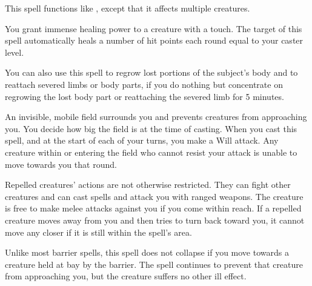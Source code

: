 \begin{spelleffect}
    This spell functions like , except that it affects multiple creatures.
\end{spelleffect}

\spelldur{\durshort}
\begin{spelleffect}
    You grant immense healing power to a creature with a touch. The target of this spell automatically heals a number of hit points each round equal to your caster level.
    \par You can also use this spell to regrow lost portions of the subject's body and to reattach severed limbs or body parts, if you do nothing but concentrate on regrowing the lost body part or reattaching the severed limb for 5 minutes.
\end{spelleffect}

\spelldur{\durshort \dismissable}
\begin{spelleffect}
    An invisible, mobile field surrounds you and prevents creatures from approaching you. You decide how big the field is at the time of casting. When you cast this spell, and at the start of each of your turns, you make a Will attack. Any creature within or entering the field who cannot resist your attack is unable to move towards you that round.

    Repelled creatures' actions are not otherwise restricted. They can fight other creatures and can cast spells and attack you with ranged weapons. The creature is free to make melee attacks against you if you come within reach. If a repelled creature moves away from you and then tries to turn back toward you, it cannot move any closer if it is still within the spell's area.
\end{spelleffect}
\begin{spellnotes}
    Unlike most barrier spells, this spell does not collapse if you move towards a creature held at bay by the barrier. The spell continues to prevent that creature from approaching you, but the creature suffers no other ill effect.
\end{spellnotes}

